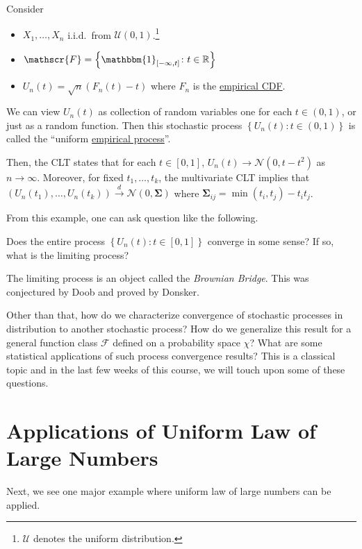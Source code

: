 \begin{eg}
	Consider
	\begin{itemize}
		\item \(X_1, \dots , X_n\) i.i.d.\ from \(\mathcal{U} (0, 1)\).\footnote{\(\mathcal{U}\) denotes the uniform distribution.}
		\item \(\mathscr{F} = \left\{ \mathbbm{1}_{[-\infty , t]} \colon t\in \mathbb{R}  \right\} \)
		\item \(U_n(t) = \sqrt{n} (F_n(t) - t) \) where \(F_n\) is the \hyperref[def:empirical-CDF]{empirical CDF}.
	\end{itemize}
	We can view \(U_n(t) \) as collection of random variables one for each \(t\in (0, 1)\), or just as a random function. Then this stochastic process \(\left\{ U_n(t)\colon t\in (0, 1) \right\} \) is called the ``uniform \hyperref[def:EP]{empirical process}''.

	Then, the CLT states that for each \(t\in [0, 1]\), \(U_n(t) \to \mathcal{N} (0, t - t^2)\) as \(n \to \infty \). Moreover, for fixed \(t_1, \dots , t_k\), the multivariate CLT implies that \((U_n(t_1), \dots , U_n(t_k)) \overset{d}{\to } \mathcal{N} (0, \mathbf{\Sigma} ) \) where \(\mathbf{\Sigma} _{ij} = \min (t_i, t_j) - t_i t_j\).
\end{eg}

From this example, one can ask question like the following.

\begin{problem*}
	Does the entire process \(\left\{ U_n(t)\colon t\in [0, 1] \right\} \) converge in some sense? If so, what is the limiting process?
\end{problem*}
\begin{answer}
	The limiting process is an object called the \emph{Brownian Bridge}. This was conjectured by Doob and proved by Donsker.
\end{answer}

Other than that, how do we characterize convergence of stochastic processes in distribution to another stochastic process? How do we generalize this result for a general function class \(\mathscr{F} \) defined on a probability space \(\chi \)? What are some statistical applications of such process convergence results? This is a classical topic and in the last few weeks of this course, we will touch upon some of these questions.

\section{Applications of Uniform Law of Large Numbers}
Next, we see one major example where uniform law of large numbers can be applied.


